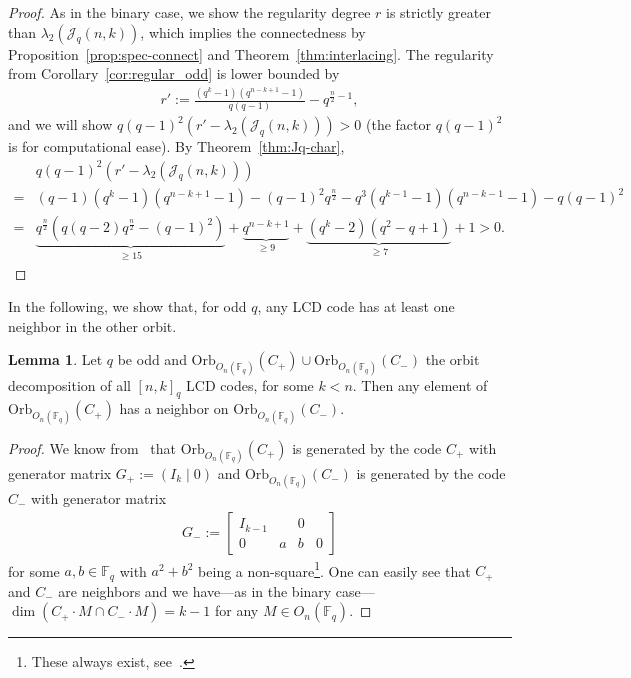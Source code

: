 \documentclass[11pt]{article}
\theoremstyle{definition}
\newtheorem{lemma}[theorem]{Lemma}
\newcommand{\F}{\mathbb{F}}
\newcommand{\Orb}{\mathrm{Orb}}
\newcommand{\CurJ}{\mathcal{J}}
\newcommand{\Jq}{\CurJ}
\newcommand{\Ort}{O}
\begin{document}
\begin{proof}
	As in the binary case, we show the regularity degree $r$ is strictly greater than $\lambda_2(\Jq_q(n, k))$, which implies the connectedness by Proposition~\ref{prop:spec-connect} and Theorem~\ref{thm:interlacing}. 
	 The regularity from Corollary~\ref{cor:regular_odd} is lower bounded by 
	\begin{align*}
		r':= \frac{(q^k - 1)(q^{n - k + 1} - 1)}{q (q - 1)} - q^{\frac{n}{2} - 1},
	\end{align*}
	and we will show $q {(q - 1)}^2 (r' - \lambda_2(\Jq_q(n, k))) > 0$ (the factor $q {(q - 1)}^2 $ is for computational ease). 
	By Theorem~\ref{thm:Jq-char},
	\begin{align*}
		& q  {(q - 1)}^2 (r' - \lambda_2(\Jq_q(n, k))) \\
		=& (q - 1) (q^k - 1)(q^{n - k + 1} - 1) - {(q - 1)}^2 q^{\frac{n}{2}}  - q^3 (q^{k - 1} - 1) (q^{n - k - 1} - 1) - q {(q - 1)}^2 \\
		=& \underbrace{q^{\frac{n}{2}} (q(q - 2) q^{\frac{n}{2}} - {(q - 1)}^2)}_{\geq 15}
		+ \underbrace{q^{n - k + 1}}_{\geq 9}
		+ \underbrace{(q^k - 2)(q^2 - q + 1)}_{\geq 7} + 1
		> 0.
	\end{align*}
\end{proof}

In the following, we show that, for odd $q$, any LCD code has at least one neighbor in the other orbit.

\begin{lemma}\label{lem:orbit-neighbors}
	Let $q$ be odd and $\Orb_{\Ort_n(\F_q)}(C_+) \cup \Orb_{\Ort_n(\F_q)}(C_-)$ the orbit decomposition of all ${[n, k]}_q$ LCD codes, for some $k < n$.
	Then any element of $\Orb_{\Ort_n(\F_q)}(C_+)$ has a neighbor on $\Orb_{\Ort_n(\F_q)}(C_-)$.
\end{lemma}

\begin{proof}
	We know from~\cite{CMTQ18} that $\Orb_{\Ort_n(\F_q)}(C_+)$ is generated by the code $C_+$ with generator matrix $G_+ := (I_k \mid 0)$ and $\Orb_{\Ort_n(\F_q)}(C_-)$ is generated by the code $C_-$ with generator matrix 
	\begin{align*}
		G_- := \begin{bmatrix}
			I_{k-1} &   & 0 &   \\
			0	   & a & b & 0
		\end{bmatrix}
	\end{align*}
	for some $a,b\in \F_q$ with $a^2 + b^2$ being a non-square\footnote{These always exist, see~\cite{CMTQ18}.}.
	One can easily see that $C_+$ and $C_-$ are neighbors and we have---as in the binary case---$\dim(C_+ \cdot M \cap C_- \cdot M)=k-1$ for any $M\in \Ort_n(\F_q)$.
\end{proof}
\end{document}
